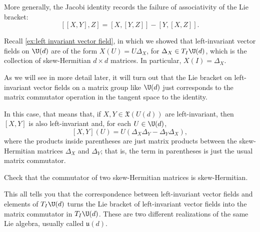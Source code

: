 More generally, the Jacobi identity records the failure of associativity of the Lie bracket:
\[
	[[X,Y],Z] = [X,[Y,Z]] - [Y,[X,Z]].
\]

\begin{example}
	Recall \cref{ex:left invariant vector field}, in which we showed that left-invariant vector fields on $\U(d)$ are of the form $X(U) = U \Delta_X$, for $\Delta_X \in T_I\U(d)$, which is the collection of skew-Hermitian $d \times d$ matrices. In particular, $X(I) = \Delta_X$.
	
	As we will see in more detail later, it will turn out that the Lie bracket on left-invariant vector fields on a matrix group like $\U(d)$ just corresponds to the matrix commutator operation in the tangent space to the identity. 
	
	In this case, that means that, if $X,Y \in \mathfrak{X}(U(d))$ are left-invariant, then $[X,Y]$ is also left-invariant and, for each $U \in \U(d)$,
	\[
		[X,Y](U) = U(\Delta_X \Delta_Y - \Delta_Y \Delta_X),
	\]
	where the products inside parentheses are just matrix products between the skew-Hermitian matrices $\Delta_X$ and $\Delta_Y$; that is, the term in parentheses is just the usual matrix commutator.
	
	\begin{exercise}
		Check that the commutator of two skew-Hermitian matrices is skew-Hermitian.
	\end{exercise}
	
	This all tells you that the correspondence between left-invariant vector fields and elements of $T_I\U(d)$ turns the Lie bracket of left-invariant vector fields into the matrix commutator in $T_I \U(d)$. These are two different realizations of the same Lie algebra, usually called $\mathfrak{u}(d)$.
\end{example}

